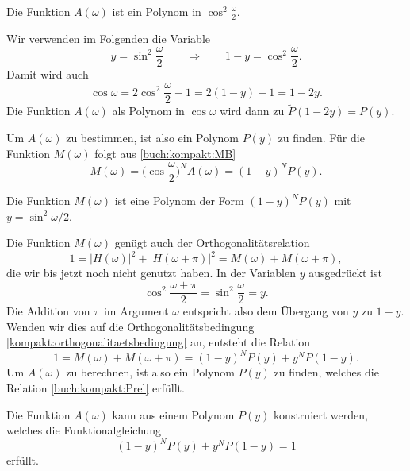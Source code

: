 \begin{konsequenz}
Die Funktion $A(\omega)$ ist ein Polynom in $\cos^2\frac{\omega}2$.
\end{konsequenz}

Wir verwenden im Folgenden die Variable 
\[
y=\sin^2\frac{\omega}2
\qquad\Rightarrow\qquad
1-y=\cos^2\frac{\omega}2.
\]
Damit wird auch 
\[
\cos\omega
=
2\cos^2\frac{\omega}2
-1
=
2(1-y)-1
=
1-2y.
\]
Die Funktion $A(\omega)$ als Polynom in $\cos\omega$ wird
dann zu $\tilde{P}(1-2y) = P(y)$.

Um $A(\omega)$ zu bestimmen, ist also ein Polynom $P(y)$ zu finden.
Für die Funktion $M(\omega)$ folgt aus \eqref{buch:kompakt:MB}
\[
M(\omega)
=
\biggl(\cos\frac{\omega}2\biggr)^N
A(\omega)
=
(1-y)^N P(y).
\]

\begin{konsequenz}
Die Funktion $M(\omega)$ ist eine Polynom der Form
$(1-y)^NP(y)$ mit $y=\sin^2\omega/2$.
\end{konsequenz}

Die Funktion $M(\omega)$ genügt auch der Orthogonalitätsrelation
\begin{equation}
1
=
|H(\omega)|^2 + |H(\omega+\pi)|^2
=
M(\omega) + M(\omega+\pi),
\label{kompakt:orthogonalitaetsbedingung}
\end{equation}
die wir bis jetzt noch nicht genutzt haben.
In der Variablen $y$ ausgedrückt ist
\[
\cos^2\frac{\omega+\pi}2
=
\sin^2\frac{\omega}2
=
y.
\]
Die Addition von $\pi$ im Argument $\omega$ entspricht also dem
Übergang von $y$ zu $1-y$.
Wenden wir dies auf die Orthogonalitätsbedingung
\eqref{kompakt:orthogonalitaetsbedingung} an, entsteht die Relation
\begin{equation}
1
=
M(\omega) + M(\omega+\pi)
=
(1-y)^N P(y) + y^N P(1-y).
\end{equation}
Um $A(\omega)$ zu berechnen, ist also ein Polynom
$P(y)$ zu finden, welches die Relation
\eqref{buch:kompakt:Prel} erfüllt.

\begin{konsequenz}
Die Funktion $A(\omega)$ kann aus einem Polynom $P(y)$ konstruiert werden,
welches die Funktionalgleichung
\begin{equation}
(1-y)^N P(y) + y^N P(1-y) = 1
\label{buch:kompakt:Prel}
\end{equation}
erfüllt.
\end{konsequenz}

